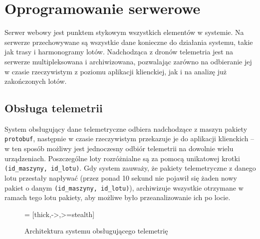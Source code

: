\section{Oprogramowanie serwerowe}

Serwer webowy jest punktem stykowym wszystkich elementów w systemie.
Na serwerze przechowywane są wszystkie dane konieczne do działania systemu, takie jak
trasy i harmonogramy lotów. Nadchodząca z dronów telemetria jest na 
serwerze multipleksowana i archiwizowana, pozwalając zarówno na odbieranie jej
w czasie rzeczywistym z poziomu aplikacji klienckiej, jak i na analizę już zakończonych lotów.

\subsection{Obsługa telemetrii}

System obsługujący dane telemetryczne odbiera nadchodzące z maszyn pakiety
\texttt{protobuf}, następnie w czasie rzeczywistym przekazuje je do aplikacji klienckich 
-- w ten sposób możliwy jest jednoczesny odbiór telemetrii na dowolnie wielu urządzeniach.
Poszczególne loty rozróżnialne są za pomocą unikatowej krotki
\texttt{(id\_maszyny, id\_lotu)}. Gdy system zauważy, że pakiety telemetryczne z danego
lotu przestały napływać (przez ponad 10 sekund nie pojawił się żaden nowy pakiet o danym
\texttt{(id\_maszyny, id\_lotu)}), archiwizuje wszystkie otrzymane w ramach tego lotu
pakiety, aby możliwe było przeanalizowanie ich po locie.


\begin{figure}[H]
	\centering\small
	\caption{
	 Architektura systemu obsługującego telemetrię 
	}
	\label{fig}
	\hspace{-1.2cm}
 = [thick,->,>=stealth]
\end{figure}

